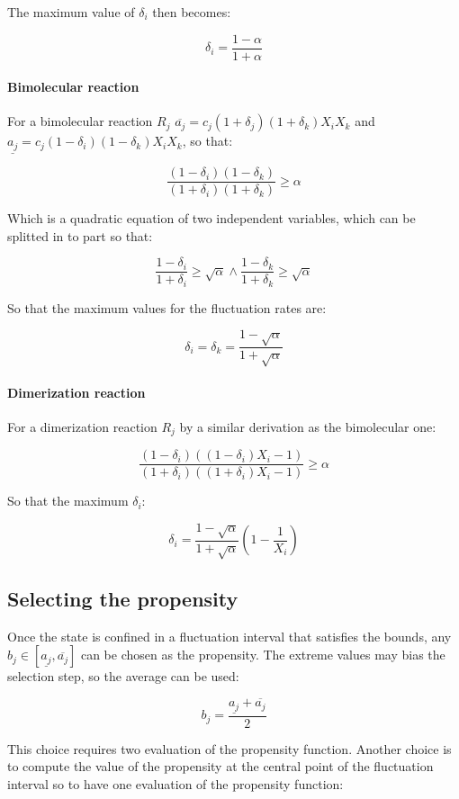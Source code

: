       The maximum value of $\delta_i$ then becomes:

      $$\delta_i = \frac{1-\alpha}{1+\alpha}$$

      \paragraph{Bimolecular reaction}
      For a bimolecular reaction $R_j$ $\overline{a_j} = c_j(1+\delta_j)(1+\delta_k)X_iX_k$ and $\underline{a_j} = c_j(1-\delta_i)(1-\delta_k)X_iX_k$, so that:

      $$\frac{(1-\delta_i)(1-\delta_k)}{(1+\delta_i)(1+\delta_k)}\ge \alpha$$

      Which is a quadratic equation of two independent variables, which can be splitted in to part so that:

      $$\frac{1-\delta_i}{1+\delta_i}\ge\sqrt{\alpha}\land\frac{1-\delta_k}{1+\delta_k}\ge\sqrt{\alpha}$$

      So that the maximum values for the fluctuation rates are:

      $$\delta_i = \delta_k = \frac{1-\sqrt{\alpha}}{1+\sqrt{\alpha}}$$

      \paragraph{Dimerization reaction}
      For a dimerization reaction $R_j$ by a similar derivation as the bimolecular one:

      $$\frac{(1-\delta_i)((1-\delta_i)X_i-1)}{(1+\delta_i)((1+\delta_i)X_i-1)}\ge\alpha$$

      So that the maximum $\delta_i$:

      $$\delta_i = \frac{1-\sqrt{\alpha}}{1+\sqrt{\alpha}}\left(1-\frac{1}{X_i}\right)$$

  \subsection{Selecting the propensity}
  Once the state is confined in a fluctuation interval that satisfies the bounds, any $b_j\in[\underline{a_j}, \overline{a_j}]$ can be chosen as the propensity.
  The extreme values may bias the selection step, so the average can be used:

  $$b_j = \frac{\underline{a_j}+\overline{a_j}}{2}$$

  This choice requires two evaluation of the propensity function.
  Another choice is to compute the value of the propensity at the central point of the fluctuation interval so to have one evaluation of the propensity function:

